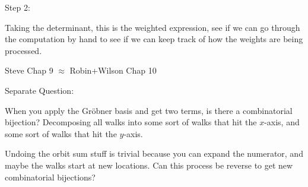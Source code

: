 \documentclass{article}
\begin{document}
Step 2:

Taking the determinant, this is the weighted expression, see if we can go through the computation by hand to see if we can keep track of how the weights are being processed.

Steve Chap 9 $\approx$ Robin+Wilson Chap 10

Separate Question:

When you apply the Gr\"obner basis and get two terms, is there a combinatorial bijection? Decomposing all walks into some sort of walks that hit the $x$-axis, and some sort of walks that hit the $y$-axis.

Undoing the orbit sum stuff is trivial because you can expand the numerator, and maybe the walks start at new locations. Can this process be reverse to get new combinatorial bijections?



\end{document}
